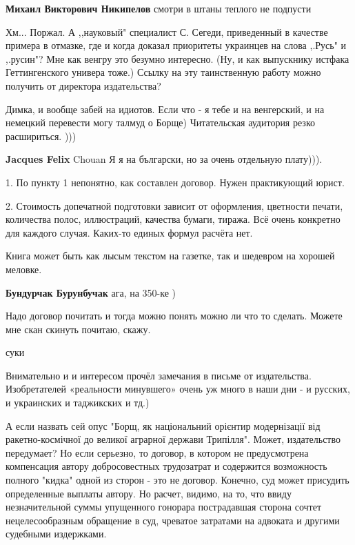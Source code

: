 \begin{itemize}
\begin{itemize}
\textbf{Михаил Викторович Никипелов} смотри в штаны теплого не подпусти
\end{itemize} %


Хм... Поржал. А ,,науковый" специалист С. Сегеди, приведенный в качестве
примера в отмазке, где и когда доказал приоритеты украинцев на слова ,.Русь" и
,.русин"? Мне как венгру это безумно интересно. (Ну, и как выпускнику истфака
Геттингенского универа тоже.) Ссылку на эту таинственную работу можно получить
от директора издательства?



Димка, и вообще забей на идиотов. Если что - я тебе и на венгерский, и на
немецкий перевести могу талмуд о Борще) Читательская аудитория резко
расшириться. )))

\begin{itemize} %
\textbf{Jacques Felix} Chouan Я я на български, но за очень отдельную плату))).
\end{itemize} %


1. По пункту 1 непонятно, как составлен договор. Нужен практикующий юрист.

2. Стоимость допечатной подготовки зависит от оформления, цветности печати,
количества полос, иллюстраций, качества бумаги, тиража. Всё очень конкретно для
каждого случая. Каких-то единых формул расчёта нет.

Книга может быть как лысым текстом на газетке, так и шедевром на хорошей
меловке.

\begin{itemize} %
\textbf{Бундурчак Бурунбучак} ага, на 350-ке )
\end{itemize} %

Надо договор почитать и тогда можно понять можно ли что то сделать. Можете мне скан скинуть почитаю, скажу.

суки


Внимательно и и интересом прочёл замечания в письме от издательства.
Изобретателей «реальности минувшего» очень уж много в наши дни - и русских, и
украинских и таджикских и тд.)


А если назвать сей опус "Борщ, як національний орієнтир модернізації від
ракетно-космічної до великої аграрної держави Трипілля". Может, издательство
передумает? Но если серьезно, то договор, в котором не предусмотрена
компенсация автору добросовестных трудозатрат и содержится возможность полного
"кидка" одной из сторон - это не договор. Конечно, суд может присудить
определенные выплаты автору. Но расчет, видимо, на то, что ввиду незначительной
суммы упущенного гонорара пострадавшая сторона сочтет нецелесообразным
обращение в суд, чреватое затратами на адвоката и другими судебными издержками.



\end{itemize}
